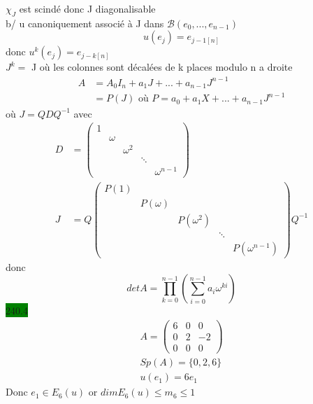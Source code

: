 \documentclass{article}
\begin{document}
\(\chi_J\) est scindé donc J diagonalisable\\
b/ u canoniquement associé à J dans \(\mathcal{B}(e_0,...,e_{n-1})\)\begin{equation*}
    u(e_j) = e_{j-1[n]}
\end{equation*} 
donc \(u^k(e_j) = e_{j-k[n]}\)\\
\(J^k=\) J où les colonnes sont décalées de k places modulo n a droite \\
\begin{align*}
    A &= A_0 I_n + a_1 J + ... + a_{n-1}J^{n-1}\\
    &= P(J) \text{ où } P = a_0 + a_1 X + ... + a_{n-1}J^{n-1}
\end{align*}
où \(J = Q D Q^{-1}\) avec \begin{align*}
    D &= \begin{pmatrix}
        1 & & & & \\
        & \omega & & & \\
        & & \omega^2 & & \\
        & & & \ddots & \\
        & & & & \omega^{n-1}
    \end{pmatrix}\\
    J&= Q \begin{pmatrix}
       P( 1) & & & & \\
        & P(\omega )& & & \\
        & & P(\omega^2 )& & \\
        & & & \ddots & \\
        & & & & P(\omega^{n-1})
    \end{pmatrix}Q^{-1}
\end{align*}
donc \begin{equation*}
    det A = \prod_{k=0}^{n-1}(\sum_{i=0}^{n-1}a_i \omega^{ki})
\end{equation*}
\noindent \colorbox{green}{240.4}\\
\begin{align*}
    A = \begin{pmatrix}
        6 & 0& 0\\
        0& 2& -2\\
        0 & 0 & 0
    \end{pmatrix}\\
    Sp(A) = \{0,2,6\}\\
    u(e_1) = 6e_1 
\end{align*}
Donc \(e_1 \in E_6(u)\) or \(dim E_6(u)\leq m_6 \leq 1\)\\
\end{document}

